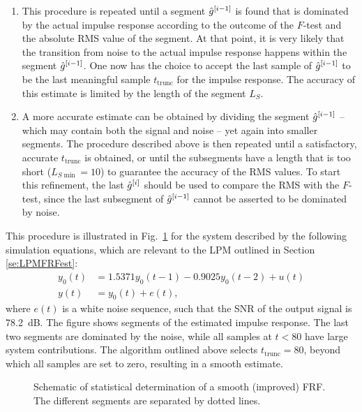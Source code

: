 \begin{enumerate}
  \item This procedure is repeated until a segment ${\hat{g}}^{[i-1]}$ is found that is dominated by the actual impulse response according to the outcome of the $F$-test and the absolute RMS value of the segment.
  At that point, it is very likely that the transition from noise to the actual impulse response happens within the segment ${\hat{g}}^{[i-1]}$.
  One now has the choice to accept the last sample of ${\hat{g}}^{[i-1]}$ to be the last meaningful sample $t_{\mathrm{trunc}}$ for the impulse response.
  The accuracy of this estimate is limited by the length of the segment $L_S$.

  \item
  A more accurate estimate can be obtained by dividing the segment ${\hat{g}}^{[i-1]}$ -- which may contain both the signal and noise -- yet again into smaller segments. The procedure described above is then repeated until a satisfactory, accurate $t_{\mathrm{trunc}}$ is obtained, or until the subsegments have a length that is too short ($L_{S\min} = 10$) to guarantee the accuracy of the RMS values. %
  To start this refinement, the last ${\hat{g}}^{[i]}$ should be used to compare the RMS with the $F$-test, since the last subsegment of ${\hat{g}}^{[i-1]}$ cannot be asserted to be dominated by noise.

\end{enumerate}
This procedure is illustrated in Fig.~\ref{FRF_truncate_stat_EG} for the system described by the following simulation equations, which are relevant to the LPM outlined in Section \ref{se:LPMFRFest}:
\begin{subequations}
\label{eq:systemSimulations}
\begin{align}
y_0(t)  &= 1.5371y_0(t-1)    -0.9025y_0(t-2) + u(t)
\\
y(t) &= y_0(t) + e(t),
\end{align}
\end{subequations}
where $e(t)$ is a white noise sequence, such that the SNR of the output signal is 78.2~dB.
The figure shows segments of the estimated impulse response. The last two segments are dominated by the noise, while all samples at $t<80$ have large system contributions. The algorithm outlined above selects $t_{\mathrm{trunc}} = 80$, beyond which all samples are set to zero, resulting in a smooth estimate.  %

\begin{figure}[tbh] %
\centering
 \setlength{}
 \setlength{}
  
\caption{Schematic of statistical determination of a smooth (improved) FRF. The different segments are separated by dotted lines.}
\label{FRF_truncate_stat_EG}
\end{figure}